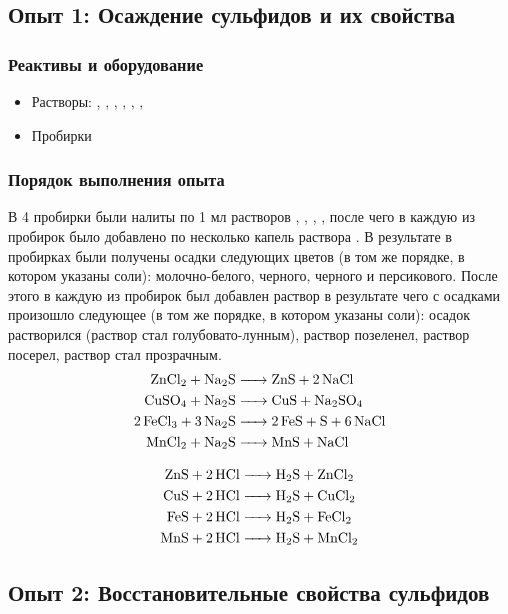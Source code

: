 \documentclass[a4paper, 12pt]{article}
\begin{document}
\subsection{Опыт 1: Осаждение сульфидов и их свойства}

\subsubsection{Реактивы и оборудование}

\begin{itemize}
	\item Растворы: , , , , , , 
	
	\item Пробирки
\end{itemize}

\subsubsection{Порядок выполнения опыта}

В 4 пробирки были налиты по 1 мл растворов , , , , после чего в каждую из пробирок было добавлено по несколько капель раствора . В результате в пробирках были получены осадки следующих цветов (в том же порядке, в котором указаны соли): молочно-белого, черного, черного и персикового. После этого в каждую из пробирок был добавлен раствор  в результате чего с осадками произошло следующее  (в том же порядке, в котором указаны соли): осадок растворился (раствор стал голубовато-лунным), раствор позеленел, раствор посерел, раствор стал прозрачным.
\begin{align}
	\ce{ZnCl2 + Na2S &-> ZnS + 2 NaCl}\\
	\ce{CuSO4 + Na2S &-> CuS + Na2SO4}\\
	\ce{2FeCl3 + 3Na2S &-> 2 FeS + S + 6 NaCl}\\
	\ce{MnCl2 + Na2S &->  MnS + NaCl}
\end{align}

\begin{align}
	\ce{ZnS + 2HCl &-> H2S + ZnCl2}\\
	\ce{CuS + 2HCl &-> H2S + CuCl2}\\
	\ce{FeS + 2HCl &-> H2S + FeCl2}\\
	\ce{MnS + 2HCl &-> H2S + MnCl2}
\end{align}

\subsection{Опыт 2: Восстановительные свойства сульфидов}
\end{document}
